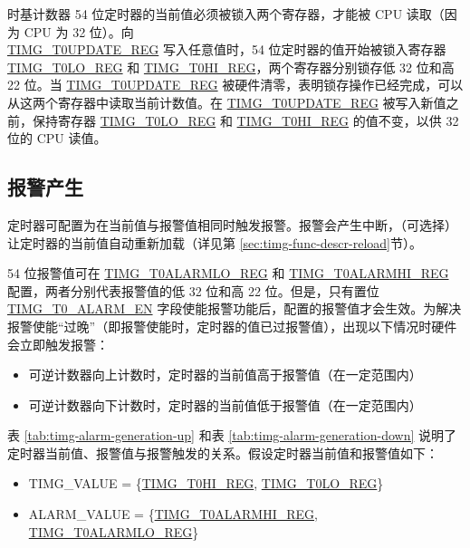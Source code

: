 \documentclass[main\_\_CN.tex]{subfiles}
\begin{document}
时基计数器 54 位定时器的当前值必须被锁入两个寄存器，才能被 CPU 读取（因为 CPU 为 32 位）。向 \\\hyperref[regdesc:TIMGTXUPDATEREG]{TIMG\_T0UPDATE\_REG} 写入任意值时，54 位定时器的值开始被锁入寄存器 \hyperref[regdesc:TIMGTXLOREG]{TIMG\_T0LO\_REG} 和 \hyperref[regdesc:TIMGTXHIREG]{TIMG\_T0HI\_REG}，两个寄存器分别锁存低 32 位和高 22 位。当 \hyperref[regdesc:TIMGTXUPDATEREG]{TIMG\_T0UPDATE\_REG} 被硬件清零，表明锁存操作已经完成，可以从这两个寄存器中读取当前计数值。在 \hyperref[regdesc:TIMGTXUPDATEREG]{TIMG\_T0UPDATE\_REG} 被写入新值之前，保持寄存器 \hyperref[regdesc:TIMGTXLOREG]{TIMG\_T0LO\_REG} 和 \hyperref[regdesc:TIMGTXHIREG]{TIMG\_T0HI\_REG}
的值不变，以供 32 位的 CPU 读值。

\subsection{报警产生}
定时器可配置为在当前值与报警值相同时触发报警。报警会产生中断，（可选择）让定时器的当前值自动重新加载（详见第 \ref{sec:timg-func-descr-reload}节）。

54 位报警值可在 \hyperref[regdesc:TIMGTXALARMLOREG]{TIMG\_T0ALARMLO\_REG} 和 \hyperref[regdesc:TIMGTXALARMHIREG]{TIMG\_T0ALARMHI\_REG} 配置，两者分别代表报警值的低 32 位和高 22 位。但是，只有置位 \hyperref[fielddesc:TIMGTXALARMEN]{TIMG\_T0\_ALARM\_EN} 字段使能报警功能后，配置的报警值才会生效。为解决报警使能“过晚”（即报警使能时，定时器的值已过报警值），出现以下情况时硬件会立即触发报警：
\begin{itemize}
    \item 可逆计数器向上计数时，定时器的当前值高于报警值（在一定范围内）
    \item 可逆计数器向下计数时，定时器的当前值低于报警值（在一定范围内）
\end{itemize}

表 \ref{tab:timg-alarm-generation-up} 和表 \ref{tab:timg-alarm-generation-down} 说明了定时器当前值、报警值与报警触发的关系。假设定时器当前值和报警值如下：

\begin{itemize}
    \item TIMG\_VALUE = \{\hyperref[regdesc:TIMGTXHIREG]{TIMG\_T0HI\_REG}, \hyperref[regdesc:TIMGTXLOREG]{TIMG\_T0LO\_REG}\}
    \item ALARM\_VALUE = \{\hyperref[regdesc:TIMGTXALARMHIREG]{TIMG\_T0ALARMHI\_REG}, \hyperref[regdesc:TIMGTXALARMLOREG]{TIMG\_T0ALARMLO\_REG}\}
\end{itemize}
\end{document}
